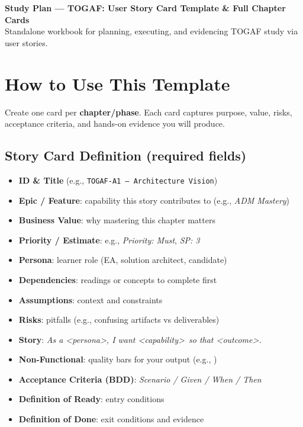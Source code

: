 \documentclass[11pt,a4paper]{article}
\newcommand{\Tag}[1]{%
  \tcbox[
    on line, rounded corners,
    colback=chipback, colframe=chipborder,
    boxrule=0.3pt, left=5pt, right=5pt, top=2pt, bottom=2pt]{\footnotesize #1}%
}
\begin{document}
\begin{center}
  {\Large \bfseries Study Plan — TOGAF: User Story Card Template \& Full Chapter Cards}\\[2pt]
  {\small Standalone workbook for planning, executing, and evidencing TOGAF study via user stories.}
\end{center}

\section*{How to Use This Template}
Create one card per \textbf{chapter/phase}. Each card captures purpose, value, risks, acceptance criteria, and hands-on evidence you will produce.

\subsection*{Story Card Definition (required fields)}
\begin{itemize}[leftmargin=1.2em]
  \item \textbf{ID \& Title} (e.g., \texttt{TOGAF-A1 — Architecture Vision})
  \item \textbf{Epic / Feature}: capability this story contributes to (e.g., \emph{ADM Mastery})
  \item \textbf{Business Value}: why mastering this chapter matters
  \item \textbf{Priority / Estimate}: e.g., \emph{Priority: Must}, \emph{SP: 3}
  \item \textbf{Persona}: learner role (EA, solution architect, candidate)
  \item \textbf{Dependencies}: readings or concepts to complete first
  \item \textbf{Assumptions}: context and constraints
  \item \textbf{Risks}: pitfalls (e.g., confusing artifacts vs deliverables)
  \item \textbf{Story}: \emph{As a \textless persona\textgreater, I want \textless capability\textgreater\ so that \textless outcome\textgreater.}
  \item \textbf{Non-Functional}: quality bars for your output (e.g., \Tag{Accuracy} \Tag{Traceability})
  \item \textbf{Acceptance Criteria (BDD)}: \emph{Scenario / Given / When / Then}
  \item \textbf{Definition of Ready}: entry conditions
  \item \textbf{Definition of Done}: exit conditions and evidence
\end{itemize}
\end{document}
